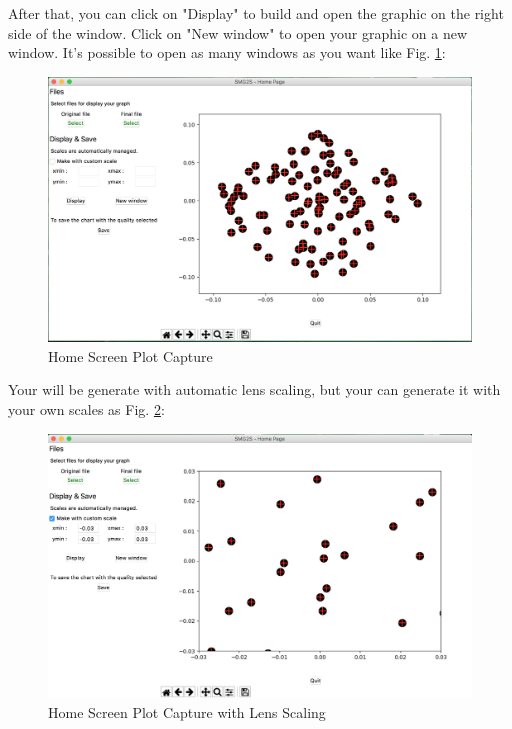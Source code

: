 \documentclass[a4paper, 10 pt]{report}
\begin{document}
After that, you can click on "Display" to build and open the graphic on the right side of the window. Click on "New window" to open your graphic on a new window. It's possible to open as many windows as you want like Fig. \ref{fig:Home Screen Plot Capture}:

\begin{figure}[htbp]
				\label{fig:Home Screen Plot Capture}
	\caption{Home Screen Plot Capture}
		\centering
	\includegraphics[width=12cm]{home_screen.png}
\end{figure}

Your will be generate with automatic lens scaling, but your can generate it with your own scales as Fig. \ref{fig:Home Screen Plot Capture with lens scaling}:

\begin{figure}[htbp]
	\label{fig:Home Screen Plot Capture with lens scaling}
	\caption{Home Screen Plot Capture with Lens Scaling}
		\centering
	\includegraphics[width=12cm]{home_screen_custom.png}
\end{figure}


	\newpage
\end{document}
